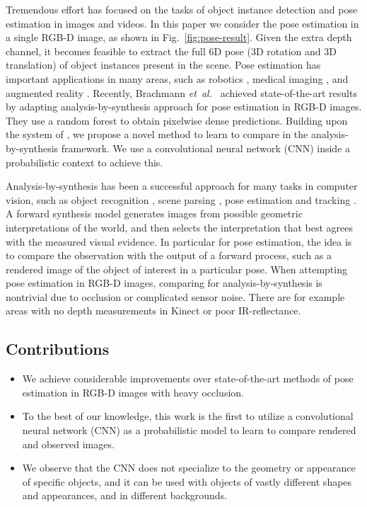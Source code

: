 \documentclass[10pt,letterpaper]{article}
\newcommand{\etal}{\mbox{\emph{et al.\ }}}
\begin{document}
Tremendous effort has focused on the tasks of object instance detection and pose estimation in images and videos. 
In this paper we consider the pose estimation in a single RGB-D image, as shown in Fig.~\ref{fig:pose-result}.
Given the extra depth channel, it becomes feasible to extract the full 6D pose (3D rotation and 3D translation) of object instances present in the scene.
Pose estimation has important applications in many areas, such as robotics \cite{Martinez_Torres_2010,zhu2014grasping}, medical imaging \cite{ralovich_2014}, and augmented reality \cite{hagbi_2011}.
Recently, Brachmann \etal \cite{brachmann2014} achieved state-of-the-art results by adapting analysis-by-synthesis approach for pose estimation in RGB-D images. They use a random forest \cite{breiman_2001} to obtain pixelwise dense predictions.
Building upon the system of \cite{brachmann2014}, we propose a novel method to learn to compare in the analysis-by-synthesis framework. We use a convolutional neural network (CNN) inside a probabilistic context to achieve this.

Analysis-by-synthesis has been a successful approach for many tasks in computer vision, such as object recognition \cite{Hejrati_CVPR_2014}, scene parsing \cite{Isola_SceneCollaging_2013}, pose estimation and tracking \cite{GallRS_2008}.
A forward synthesis model generates images from possible geometric interpretations of the world, and then selects the interpretation that best agrees
with the measured visual evidence. 
In particular for pose estimation, the idea is to compare the observation with the output of a forward process, such as a rendered image of the object of interest in a particular pose.  
When attempting pose estimation in RGB-D images, comparing for analysis-by-synthesis is nontrivial due to occlusion or complicated sensor noise. 
There are for example areas with no depth measurements in Kinect or poor IR-reflectance.


\subsection{Contributions}

\begin{itemize}
	\item We achieve considerable improvements over state-of-the-art methods of pose estimation in RGB-D images with heavy occlusion.
  \item To the best of our knowledge, this work is the first to utilize a convolutional neural network (CNN) as a probabilistic model to learn to compare rendered and observed images.
  \item We observe that the CNN does not specialize to the geometry or appearance of specific objects, and it can be used with objects of vastly different shapes and appearances, and in different backgrounds.
\end{itemize}
\end{document}
